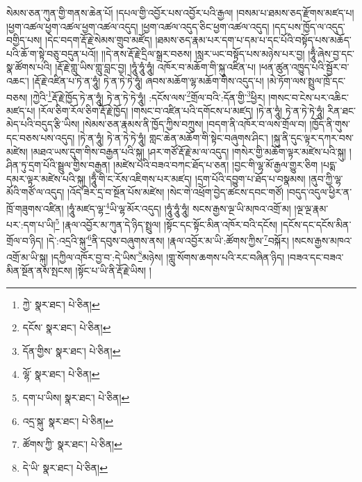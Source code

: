 སེམས་ཅན་ཀུན་གྱི་གནས་ཆེན་པོ། །དཔལ་གྱི་འབྱོར་པས་འབྱོར་པའི་རྒྱལ། །བསམ་པ་ཐམས་ཅད་རྫོགས་མཛད་པ། །ཕྱག་འཚལ་ཕྱག་འཚལ་ཕྱག་འཚལ་འདུད། །ཕྱག་འཚལ་འདུད་ཅིང་ཕྱག་འཚལ་འདུད། །དད་པས་ཁྱོད་ལ་འདུད་བགྱིད་པས། །དེང་བདག་རྡོ་རྗེ་སེམས་གྲུབ་མཛོད། །ཐམས་ཅད་རྣམ་པར་དག་པ་དམ་པ་དང་པོའི་བསྟོད་པས་མཆོད་པའི་ཆོ་ག་སྟེ་བཅུ་བདུན་པའོ།། །།དེ་ནས་རྡོ་རྗེ་དྲིལ་སྒྲར་བཅས། །སླར་ཡང་བསྟོད་པས་མཉེས་པར་བྱ། །ཧཱུྃ་ཞེས་བྱ་དང་སྣ་ཚོགས་པའི། །རྡོ་རྗེ་གླུ་ཡིས་གླུ་བླང་བྱ། །ཧཱུཾ་ཧཱུཾ་ཧཱུཾ། འཁོར་བ་མཆོག་གི་སྐུ་འཛིན་པ། །ཕན་ཚུན་འཁྱུད་པའི་སྦྱོར་བ་འཆང་། །རྡོ་རྗེ་འཛིན་པ་ཏེ་ན་ཧཱུཾ། ཏེ་ན་ཏེ་ཏེ་ཧཱུཾ། ཞབས་མཆོག་ལྷ་མཆོག་གིས་འདུད་པ། །མེ་ཏོག་ལས་སྤྲུལ་ཁྲོ་དང་བཅས། །ཀྱེའི་\footnote{ཀྱེ་  སྣར་ཐང་།  པེ་ཅིན། }རྡོ་རྗེ་ཁྱོད་ཏེ་ན་ཧཱུཾ། ཏེ་ན་ཏེ་ཏེ་ཧཱུཾ། :དངོས་ལས་\footnote{དངོས་  སྣར་ཐང་།  པེ་ཅིན། }གྲོལ་བའི་:དོན་གྱི་\footnote{དོན་གྱིས་  སྣར་ཐང་།  པེ་ཅིན། }ཕྱིར། །གསང་བ་ངེས་པར་འཆིང་མཛད་པ། །རོལ་ཅིག་རོལ་ཅིག་རྡོ་རྗེ་ཁྱོད། །གསང་བ་འཛིན་པའི་དགོངས་པ་མཛད། །ཏེ་ན་ཧཱུཾ། ཏེ་ན་ཏེ་ཏེ་ཧཱུཾ། རིན་ཐང་མེད་པའི་བདུད་རྩི་ཡིས། །སེམས་ཅན་རྣམས་ནི་ཁྱོད་ཀྱིས་བཀྲུས། །བདག་ནི་འཁོར་བ་ལས་གྲོལ་བ། །ཁྱོད་ནི་གུས་དང་བཅས་པས་འདུད། །ཏེ་ན་ཧཱུཾ། ཏེ་ན་ཏེ་ཏེ་ཧཱུཾ། གླང་ཆེན་མཆོག་གི་སྟེང་བཞུགས་ཤིང་། །སྐུ་ནི་དུང་ལྟར་དཀར་བས་མཛེས། །མཐའ་ཡས་དུག་གིས་བརྒྱན་པའི་སྐུ། །ཤར་གཙོ་རྡོ་རྗེ་མ་ལ་འདུད། །གསེར་གྱི་མཆོག་ལྟར་མཛེས་པའི་སྐུ། །ཤིན་ཏུ་དྲག་པོའི་སྦྲུལ་གྱིས་བརྒྱན། །མཛེས་པའི་བཟའ་བཀང་ཐོད་པ་ཅན། །བྱང་གི་ལྷ་མོ་རྒྱལ་གྱུར་ཅིག །པདྨ་དམར་ལྟར་མཛེས་པའི་སྐུ། །ཧཱུྃ་གི་ང་རོས་འཇིགས་པར་མཛད། །དྲག་པོའི་དབྱུག་པ་ཐོད་པ་བསྣམས། །ནུབ་ཀྱི་ལྷ་མོའི་གཙོ་ལ་འདུད། །འོད་ཟེར་དྲ་བ་སྔོན་པོས་མཛེས། །སེང་གེ་འཕྲོག་བྱེད་ཚངས་དབང་གཙོ། །བདུད་འདུལ་ཕྱིར་ན་ཁྲོ་གཟུགས་འཛིན། །ཧཱུཾ་མཛད་ལྷ་\footnote{ལྷོ་  སྣར་ཐང་།  པེ་ཅིན། }ཡི་ལྷ་མོར་འདུད། །ཧཱུཾ་ཧཱུཾ་ཧཱུཾ། སངས་རྒྱས་ལྔ་ཡི་མཁའ་འགྲོ་མ། །ལྔ་ལྔ་རྣམ་པར་:དག་པ་ཡི།\footnote{དག་པ་ཡིས།  སྣར་ཐང་།  པེ་ཅིན། } །རྣལ་འབྱོར་མ་ཀུན་དེ་ཉིད་སྤྲུལ། །སྟོང་དང་སྟོང་མིན་འཁོར་བའི་དངོས། །དངོས་དང་དངོས་མིན་གྲོལ་བ་ཉིད། །དེ་:འདྲའི་སྐུ་\footnote{འདྲ་སྐུ་  སྣར་ཐང་།  པེ་ཅིན། }ནི་དབུས་བཞུགས་ནས། །རྣལ་འབྱོར་མ་ཡི་:ཚོགས་ཀྱིས་\footnote{ཚོགས་ཀྱི་  སྣར་ཐང་།  པེ་ཅིན། }བསྐོར། །སངས་རྒྱས་མཁའ་འགྲོ་མ་ཡི་སྐུ། །དཀྱིལ་འཁོར་བྱ་བ་:དེ་ཡིས་\footnote{དེ་ཡི་  སྣར་ཐང་།  པེ་ཅིན། }མཉེས། །གླུ་སོགས་ཆགས་པའི་རང་བཞིན་ཉིད། །བཟའ་དང་བཟའ་མིན་སྔོན་ནས་སྤངས། །སྟོང་པ་ཡི་ནི་རྡོ་རྗེ་ཡིས། །
